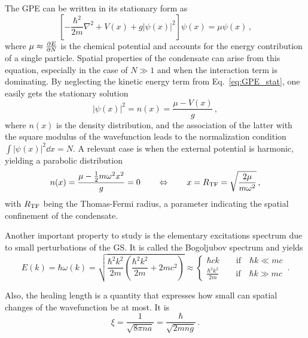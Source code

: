 The GPE can be written in its stationary form as
\begin{equation}
    \left[ 
        -\frac{\hbar^2}{2m}\nabla^2 + V(x) + g|\psi(x)|^2
    \right] \psi(x) = \mu \psi(x)\, ,
    \label{eq:GPE_stat}
\end{equation}
where $\mu \approx \pdv{E}{N}$ is the chemical potential and accounts for the energy contribution of a single particle. Spatial properties of the condensate can arise from this equation, especially in the case of $N \gg 1$ and when the interaction term is dominating. By neglecting the kinetic energy term from Eq.\ \eqref{eq:GPE_stat}, one easily gets the stationary solution
\[
    |\psi(x)|^2 = n(x) = \frac{\mu - V(x)}{g}\, ,
\]
where $n(x)$ is the density distribution, and the association of the latter with the square modulus of the wavefunction leads to the normalization condition $\int |\psi(x)|^2 \dd x = N$. A relevant case is when the external potential is harmonic, yielding a parabolic distribution
\begin{equation*}
    n(x) = \frac{\mu - \frac{1}{2}m\omega^2x^2}{g} = 0 \qquad
    \Leftrightarrow \qquad
    x = R_{\rm TF} = \sqrt{\frac{2\mu}{m\omega^2}}\, ,
\end{equation*}
with $R_{\rm TF}$ being the Thomas-Fermi radius, a parameter indicating the spatial confinement of the condensate.

Another important property to study is the elementary excitations spectrum due to small perturbations of the GS. It is called the Bogoljubov spectrum and yields
\begin{equation*}
    E(k) = \hbar \omega(k) = \sqrt{\frac{\hbar^2 k^2}{2m}\left(\frac{\hbar^2 k^2}{2m} + 2mc^2\right)} \approx
    \begin{cases}
        \hbar c k \qquad \text{if} \quad \hbar k \ll mc\\
        \frac{\hbar^2 k^2}{2m} \qquad \text{if} \quad \hbar k \gg mc
    \end{cases}\, .
    \label{eq:excit}
\end{equation*}

Also, the healing length is a quantity that expresses how small can spatial changes of the wavefunction be at most. It is
\begin{equation*}
    \xi = \frac{1}{\sqrt{8\pi n a}} = \frac{\hbar}{\sqrt{2m n g}}\, .
\end{equation*}

